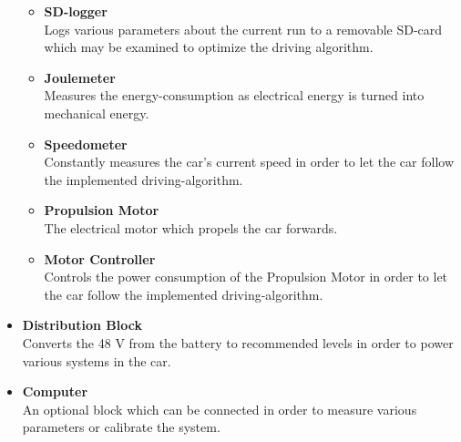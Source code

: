 \begin{itemize}
	\begin{itemize}
		\item \textbf{SD-logger}\\
		Logs various parameters about the current run to a removable SD-card which may be examined to optimize the driving algorithm.
		\item \textbf{Joulemeter}\\
		Measures the energy-consumption as electrical energy is turned into mechanical energy.
		\item \textbf{Speedometer}\\
		Constantly measures the car's current speed in order to let the car follow the implemented driving-algorithm.
		\item \textbf{Propulsion Motor}\\
		The electrical motor which propels the car forwards.
		\item \textbf{Motor Controller}\\
		Controls the power consumption of the Propulsion Motor in order to let the car follow the implemented driving-algorithm.
	\end{itemize}
	\item \textbf{Distribution Block}\\
	Converts the 48 V from the battery to recommended levels in order to power various systems in the car.
	\item \textbf{Computer}\\
	An optional block which can be connected in order to measure various parameters or calibrate the system.
\end{itemize}